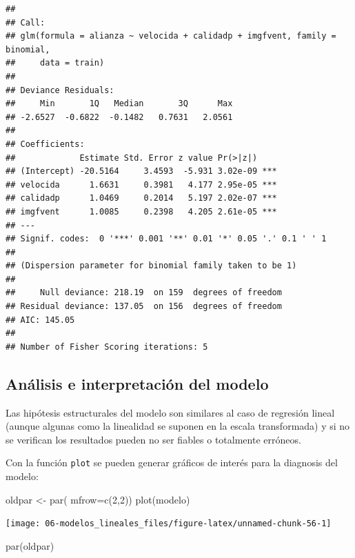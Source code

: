 \documentclass[
  spanish,
]{book}
\newenvironment{Shaded}{\begin{snugshade}}{\end{snugshade}}
\newcommand{\AttributeTok}[1]{\textcolor[rgb]{0.77,0.63,0.00}{#1}}
\newcommand{\DecValTok}[1]{\textcolor[rgb]{0.00,0.00,0.81}{#1}}
\newcommand{\FunctionTok}[1]{\textcolor[rgb]{0.00,0.00,0.00}{#1}}
\newcommand{\NormalTok}[1]{#1}
\newcommand{\OtherTok}[1]{\textcolor[rgb]{0.56,0.35,0.01}{#1}}
\theoremstyle{break}
\theoremstyle{definition}
\theoremstyle{definition}
\theoremstyle{definition}
\theoremstyle{definition}
\theoremstyle{remark}
\begin{document}
\begin{verbatim}
## 
## Call:
## glm(formula = alianza ~ velocida + calidadp + imgfvent, family = binomial, 
##     data = train)
## 
## Deviance Residuals: 
##     Min       1Q   Median       3Q      Max  
## -2.6527  -0.6822  -0.1482   0.7631   2.0561  
## 
## Coefficients:
##             Estimate Std. Error z value Pr(>|z|)    
## (Intercept) -20.5164     3.4593  -5.931 3.02e-09 ***
## velocida      1.6631     0.3981   4.177 2.95e-05 ***
## calidadp      1.0469     0.2014   5.197 2.02e-07 ***
## imgfvent      1.0085     0.2398   4.205 2.61e-05 ***
## ---
## Signif. codes:  0 '***' 0.001 '**' 0.01 '*' 0.05 '.' 0.1 ' ' 1
## 
## (Dispersion parameter for binomial family taken to be 1)
## 
##     Null deviance: 218.19  on 159  degrees of freedom
## Residual deviance: 137.05  on 156  degrees of freedom
## AIC: 145.05
## 
## Number of Fisher Scoring iterations: 5
\end{verbatim}

\hypertarget{analisis-glm}{%
\subsection{Análisis e interpretación del modelo}\label{analisis-glm}}

Las hipótesis estructurales del modelo son similares al caso de regresión lineal (aunque algunas como la linealidad se suponen en la escala transformada) y si no se verifican los resultados pueden no ser fiables o totalmente erróneos.

Con la función \texttt{plot} se pueden generar gráficos de interés para la diagnosis del modelo:

\begin{Shaded}
\begin{Highlighting}[]
\NormalTok{oldpar }\OtherTok{\textless{}{-}} \FunctionTok{par}\NormalTok{( }\AttributeTok{mfrow=}\FunctionTok{c}\NormalTok{(}\DecValTok{2}\NormalTok{,}\DecValTok{2}\NormalTok{))}
\FunctionTok{plot}\NormalTok{(modelo)}
\end{Highlighting}
\end{Shaded}

\begin{center}\texttt{[image: 06-modelos\_lineales\_files/figure-latex/unnamed-chunk-56-1]} \end{center}

\begin{Shaded}
\begin{Highlighting}[]
\FunctionTok{par}\NormalTok{(oldpar)}
\end{Highlighting}
\end{Shaded}
\end{document}
